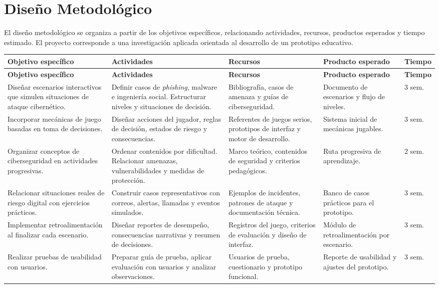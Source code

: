 \section{Diseño Metodológico}

El diseño metodológico se organiza a partir de los objetivos específicos, relacionando actividades, recursos, productos esperados y tiempo estimado. El proyecto corresponde a una investigación aplicada orientada al desarrollo de un prototipo educativo.

\newpage

\small
\renewcommand{\arraystretch}{1.15}
\begin{longtable}{|p{}|p{}|p{}|p{}|p{}|}
\hline
\textbf{Objetivo específico} & \textbf{Actividades} & \textbf{Recursos} & \textbf{Producto esperado} & \textbf{Tiempo} \\
\hline
\endfirsthead
\hline
\textbf{Objetivo específico} & \textbf{Actividades} & \textbf{Recursos} & \textbf{Producto esperado} & \textbf{Tiempo} \\
\hline
\endhead
Diseñar escenarios interactivos que simulen situaciones de ataque cibernético. &
Definir casos de \textit{phishing}, malware e ingeniería social. Estructurar niveles y situaciones de decisión. &
Bibliografía, casos de amenaza y guías de ciberseguridad. &
Documento de escenarios y flujo de niveles. &
3 sem. \\
\hline
Incorporar mecánicas de juego basadas en toma de decisiones. &
Diseñar acciones del jugador, reglas de decisión, estados de riesgo y consecuencias. &
Referentes de juegos serios, prototipos de interfaz y motor de desarrollo. &
Sistema inicial de mecánicas jugables. &
3 sem. \\
\hline
Organizar conceptos de ciberseguridad en actividades progresivas. &
Ordenar contenidos por dificultad. Relacionar amenazas, vulnerabilidades y medidas de protección. &
Marco teórico, contenidos de seguridad y criterios pedagógicos. &
Ruta progresiva de aprendizaje. &
2 sem. \\
\hline
Relacionar situaciones reales de riesgo digital con ejercicios prácticos. &
Construir casos representativos con correos, alertas, llamadas y eventos simulados. &
Ejemplos de incidentes, patrones de ataque y documentación técnica. &
Banco de casos prácticos para el prototipo. &
3 sem. \\
\hline
Implementar retroalimentación al finalizar cada escenario. &
Diseñar reportes de desempeño, consecuencias narrativas y resumen de decisiones. &
Registros del juego, criterios de evaluación y diseño de interfaz. &
Módulo de retroalimentación por escenario. &
3 sem. \\
\hline
Realizar pruebas de usabilidad con usuarios. &
Preparar guía de prueba, aplicar evaluación con usuarios y analizar observaciones. &
Usuarios de prueba, cuestionario y prototipo funcional. &
Reporte de usabilidad y ajustes del prototipo. &
3 sem. \\
\hline
\end{longtable}
\renewcommand{\arraystretch}{1}
\normalsize
